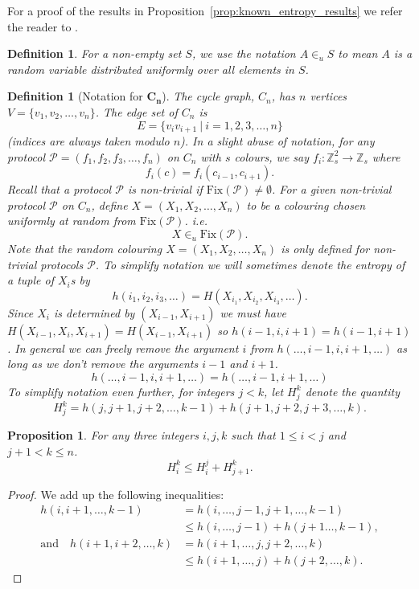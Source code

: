 \documentclass{birkjour}
\newtheorem{prop}[thm]{Proposition}
\theoremstyle{indenteddefinition}
\newtheorem{defn}[thm]{Definition}
\theoremstyle{indenteddefinition}
\numberwithin{equation}{section}
\renewcommand{\Pr}{\mathcal{P}}
\newcommand{\Z}{\mathbb{Z}}
\newcommand{\Fix}{\mbox{Fix}}
\begin{document}
For a proof of the results in Proposition~\ref{prop:known_entropy_results} we refer the reader to \cite{Cover2006elements}. 

\begin{defn}
For a non-empty set $S$, we use the notation $A \in_u S$ to mean $A$ is a random variable distributed uniformly over all elements in $S$. 
\end{defn}

\begin{defn}[Notation for $\mathbf{C_n}$]
\label{defn:C_n}
The cycle graph, $C_n$, has $n$ vertices $V = \{ v_1,v_2, \ldots ,v_n \}$. The edge set of $C_n$ is 
	$$ E = \{ v_iv_{i+1} \: | \: i = 1,2,3, \ldots ,n \} $$
(indices are always taken modulo $n$). In a slight abuse of notation, for any protocol $\Pr = (f_1,f_2,f_3, \ldots ,f_n)$ on $C_n$ with $s$ colours, we say $f_i : \Z_s^2 \rightarrow \Z_s$ where 
	$$ f_i(c) = f_i(c_{i-1},c_{i+1}). $$
Recall that a protocol $\Pr$ is non-trivial if $\Fix(\Pr) \neq \emptyset$. For a given non-trivial protocol $\Pr$ on $C_n$, define $X = (X_1,X_2, \ldots ,X_n)$ to be a colouring chosen uniformly at random from $\Fix(\Pr)$. \emph{i.e.} 
	$$ X \in_u \Fix(\Pr). $$
Note that the random colouring $X = (X_1,X_2, \ldots ,X_n)$ is only defined for non-trivial protocols $\Pr$. 
To simplify notation we will sometimes denote the entropy of a tuple of $X_i$s by 
	$$ h(i_1,i_2,i_3, \ldots ) = H(X_{i_1},X_{i_2},X_{i_3}, \ldots ). $$
Since $X_i$ is determined by $(X_{i-1},X_{i+1})$ we must have $H(X_{i-1},X_i,X_{i+1}) = H(X_{i-1},X_{i+1})$ so $h(i-1,i,i+1)=h(i-1,i+1)$. In general we can freely remove the argument $i$ from $h( \ldots , i-1 , i , i+1 , \ldots )$ as long as we don't remove the arguments $i-1$ and $i+1$. 
	\begin{equation}
	\label{eq:awesome}
	h( \ldots , i-1 , i , i+1 , \ldots ) = h( \ldots , i-1 , i+1 , \ldots )
	\end{equation}
To simplify notation even further, for integers $j<k$, let $H_j^k$ denote the quantity
	$$ H_j^k = h(j,j+1,j+2, \ldots ,k-1) + h(j+1,j+2,j+3, \ldots ,k). $$
\end{defn}



\begin{prop}
\label{prop:H=sum(H)}
For any three integers $i,j,k$ such that $1 \leq i < j$ and $j+1 < k \leq n$.  
	$$ H_i^k \leq H_i^j + H_{j+1}^k. $$
\end{prop}
\begin{proof}
We add up the following inequalities:
	\begin{align*}
	h(i,i+1, \ldots , k-1) 
	& = h(i, \ldots ,j-1,j+1, \ldots , k-1) \\
	& \leq  h(i, \ldots ,j-1) + h(j+1 \ldots , k-1), \\ \mbox{and} \quad  
	h(i+1,i+2, \ldots , k) 
	& = h(i+1, \ldots ,j,j+2, \ldots , k) \\
	& \leq  h(i+1, \ldots ,j) + h(j+2, \ldots , k).
	\end{align*}
\end{proof}
\end{document}
